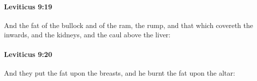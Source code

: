 		\paragraph{Leviticus 9:19} %
			\label{LEVITICUS-9-19}

			And the fat of the bullock and of the ram, the rump, and that which covereth the inwards, and the kidneys, and the caul above the liver:


		\paragraph{Leviticus 9:20} %
			\label{LEVITICUS-9-20}

			And they put the fat upon the breasts, and he burnt the fat upon the altar:


